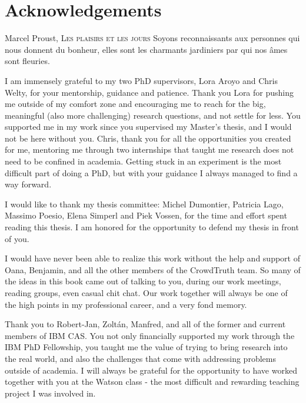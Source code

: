 
\bigskip

\begingroup
\let\clearpage\relax
\let\cleardoublepage\relax
\let\cleardoublepage\relax

\chapter*{Acknowledgements}

\begin{chapquote}{Marcel Proust, \textsc{Les plaisirs et les jours}}
Soyons reconnaissants aux personnes qui nous donnent du bonheur, elles sont les charmants jardiniers par qui nos âmes sont fleuries.
\end{chapquote}

I am immensely grateful to my two PhD supervisors, Lora Aroyo and Chris Welty, for your mentorship, guidance and patience. Thank you Lora for pushing me outside of my comfort zone and encouraging me to reach for the big, meaningful (also more challenging) research questions, and not settle for less. You supported me in my work since you supervised my Master's thesis, and I would not be here without you. Chris, thank you for all the opportunities you created for me, mentoring me through two internships that taught me research does not need to be confined in academia. Getting stuck in an experiment is the most difficult part of doing a PhD, but with your guidance I always managed to find a way forward.

I would like to thank my thesis committee: Michel Dumontier, Patricia Lago, Massimo Poesio, Elena Simperl and Piek Vossen, for the time and effort spent reading this thesis. I am honored for the opportunity to defend my thesis in front of you.

I would have never been able to realize this work without the help and support of Oana, Benjamin, and all the other members of the CrowdTruth team. So many of the ideas in this book came out of talking to you, during our work meetings, reading groups, even casual chit chat. Our work together will always be one of the high points in my professional career, and a very fond memory.

Thank you to Robert-Jan, Zoltán, Manfred, and all of the former and current members of IBM CAS. You not only financially supported my work through the IBM PhD Fellowship, you taught me the value of trying to bring research into the real world, and also the challenges that come with addressing problems outside of academia. I will always be grateful for the opportunity to have worked together with you at the Watson class - the most difficult and rewarding teaching project I was involved in.

